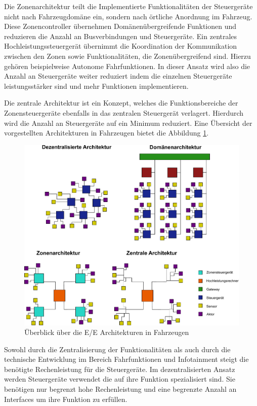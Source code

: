 Die Zonenarchitektur teilt die Implementierte Funktionalitäten der Steuergeräte nicht nach Fahrzeugdomäne ein, sondern nach örtliche Anordnung im Fahrzeug. \cite{Chou2023} Diese Zonencontroller übernehmen Domänenübergreifende Funktionen und reduzieren die Anzahl an Busverbindungen und Steuergeräte. Ein zentrales Hochleistungssteuergerät übernimmt die Koordination der Kommunikation zwischen den Zonen sowie Funktionalitäten, die Zonenübergreifend sind. Hierzu gehören beispielweise Autonome Fahrfunktionen. In dieser Ansatz wird also die Anzahl an Steuergeräte weiter reduziert indem die einzelnen Steuergeräte leistungsstärker sind und mehr Funktionen implementieren. 

Die zentrale Architektur ist ein Konzept, welches die Funktionsbereiche der Zonensteuergeräte ebenfalls in das zentralen Steuergerät verlagert. Hierdurch wird die Anzahl an Steuergeräte auf ein Minimum reduziert. Eine Übersicht der vorgestellten Architekturen in Fahrzeugen bietet die Abbildung \ref{E/E_arch}.

\begin{figure}[htbp]
	\centering
	\includegraphics[width=\textwidth]{./content/graphics/EE_arch.pdf}
	\caption{Überblick über die E/E Architekturen in Fahrzeugen}
	\label{E/E_arch}
\end{figure}

Sowohl durch die Zentralisierung der Funktionalitäten als auch durch die technische Entwicklung im Bereich Fahrfunktionen und Infotainment steigt die benötigte Rechenleistung für die Steuergeräte. Im dezentralisierten Ansatz werden Steuergeräte verwendet die auf ihre Funktion spezialisiert sind. Sie benötigen nur begrenzt hohe Rechenleistung und eine begrenzte Anzahl an Interfaces um ihre Funktion zu erfüllen. 

